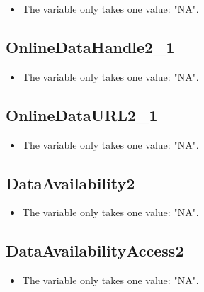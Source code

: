 \documentclass[]{article}
\providecommand{\tightlist}{%
  \setlength{\itemsep}{0pt}\setlength{\parskip}{0pt}}
\newcommand{\fullline}{\noindent\makebox[\linewidth]{\rule{\textwidth}{0.4pt}}}
\begin{document}
\begin{itemize}
\tightlist
\item
  The variable only takes one value: "NA".
\end{itemize}

\fullline

\hypertarget{onlinedatahandle2_1}{\subsection{OnlineDataHandle2\_1}\label{onlinedatahandle2_1}}

\begin{itemize}
\tightlist
\item
  The variable only takes one value: "NA".
\end{itemize}

\fullline

\hypertarget{onlinedataurl2_1}{\subsection{OnlineDataURL2\_1}\label{onlinedataurl2_1}}

\begin{itemize}
\tightlist
\item
  The variable only takes one value: "NA".
\end{itemize}

\fullline

\hypertarget{dataavailability2}{\subsection{DataAvailability2}\label{dataavailability2}}

\begin{itemize}
\tightlist
\item
  The variable only takes one value: "NA".
\end{itemize}

\fullline

\hypertarget{dataavailabilityaccess2}{\subsection{DataAvailabilityAccess2}\label{dataavailabilityaccess2}}

\begin{itemize}
\tightlist
\item
  The variable only takes one value: "NA".
\end{itemize}
\end{document}
